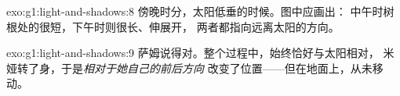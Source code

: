 \begin{solution}{exo:g1:light-and-shadows:8}
傍晚时分，太阳低垂的时候。图中应画出：
中午时树根处的很短，下午时则很长、伸展开，
两者都指向远离太阳的方向。
\end{solution}

\begin{solution}{exo:g1:light-and-shadows:9}
萨姆说得对。整个过程中，始终恰好与太阳相对，
米娅转了身，于是\emph{相对于她自己的前后方向}
改变了位置——但在地面上，从未移动。
\end{solution}
